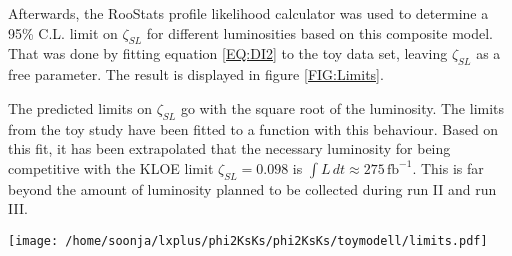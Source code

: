 Afterwards, the RooStats profile likelihood calculator was used to determine a 95\% C.L. limit on $\zeta_{SL}$ for different luminosities based on this composite model. That was done by fitting equation \eqref{EQ:DI2} to the toy data set, leaving $\zeta_{SL}$ as a free parameter. The result is displayed in figure \ref{FIG:Limits}.

The predicted limits on $\zeta_{SL}$ go with the square root of the luminosity. The limits from the toy study have been fitted to a function with this behaviour. Based on this fit, it has been extrapolated that the necessary luminosity for being competitive with the KLOE limit $\zeta_{SL} = 0.098$ is $\int L\,dt \approx 275\,\text{fb}^{-1}$. This is far beyond the amount of luminosity planned to be collected during run II and run III.

\begin{center}
\texttt{[image: /home/soonja/lxplus/phi2KsKs/phi2KsKs/toymodell/limits.pdf]}
 \label{FIG:Limits}
\end{center}



